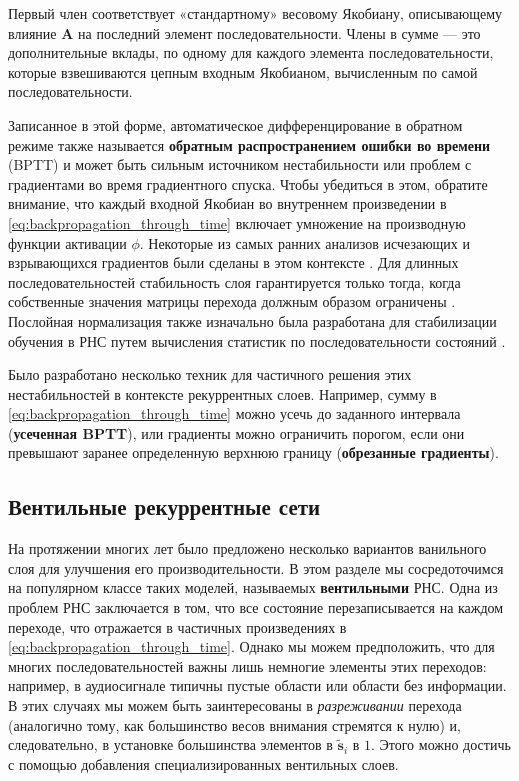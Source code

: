 Первый член соответствует «стандартному» весовому Якобиану, описывающему влияние $\mathbf{A}$ на последний элемент последовательности. Члены в сумме — это дополнительные вклады, по одному для каждого элемента последовательности, которые взвешиваются цепным входным Якобианом, вычисленным по самой последовательности. 

Записанное в этой форме, автоматическое дифференцирование в обратном режиме также называется \textbf{обратным распространением ошибки во времени} (BPTT) и может быть сильным источником нестабильности или проблем с градиентами во время градиентного спуска. Чтобы убедиться в этом, обратите внимание, что каждый входной Якобиан во внутреннем произведении в \eqref{eq:backpropagation_through_time} включает умножение на производную функции активации $\phi$. Некоторые из самых ранних анализов исчезающих и взрывающихся градиентов были сделаны в этом контексте \cite{hochreiter1998recurrent}. Для длинных последовательностей стабильность слоя гарантируется только тогда, когда собственные значения матрицы перехода должным образом ограничены \cite{gallicchio2017echo}. Послойная нормализация также изначально была разработана для стабилизации обучения в РНС путем вычисления статистик по последовательности состояний \cite{ba2016layer}.

Было разработано несколько техник для частичного решения этих нестабильностей в контексте рекуррентных слоев. Например, сумму в \eqref{eq:backpropagation_through_time} можно усечь до заданного интервала (\textbf{усеченная BPTT}), или градиенты можно ограничить порогом, если они превышают заранее определенную верхнюю границу (\textbf{обрезанные градиенты}).

\subsection{Вентильные рекуррентные сети}

На протяжении многих лет было предложено несколько вариантов ванильного слоя для улучшения его производительности. В этом разделе мы сосредоточимся на популярном классе таких моделей, называемых \textbf{вентильными} РНС. Одна из проблем РНС заключается в том, что все состояние перезаписывается на каждом переходе, что отражается в частичных произведениях в \eqref{eq:backpropagation_through_time}. Однако мы можем предположить, что для многих последовательностей важны лишь немногие элементы этих переходов: например, в аудиосигнале типичны пустые области или области без информации. В этих случаях мы можем быть заинтересованы в \textit{разреживании} перехода (аналогично тому, как большинство весов внимания стремятся к нулю) и, следовательно, в установке большинства элементов в $\widetilde{\mathbf{s}}_i$ в $1$. Этого можно достичь с помощью добавления специализированных вентильных слоев.

